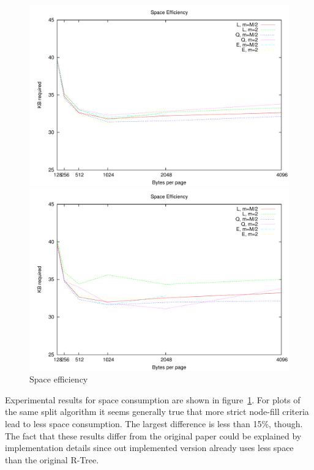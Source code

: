 \begin{figure}
\centering
\begin{minipage}{0.49\textwidth}
\centering
\includegraphics[width=\textwidth]{fig/random/figure-4-6.pdf}
\end{minipage}
\begin{minipage}{0.49\textwidth}
\centering
\includegraphics[width=\textwidth]{fig/usppp/figure-4-6.pdf}
\end{minipage}
\caption{Space efficiency}
\label{fig:4.6}
\end{figure}

Experimental results for space consumption are shown in figure~\ref{fig:4.6}. For plots of the same split algorithm it seems generally true that more strict node-fill criteria lead to less space consumption. The largest difference is less than 15\%, though. The fact that these results differ from the original paper could be explained by implementation details since out implemented version already uses less space than the original R-Tree.

